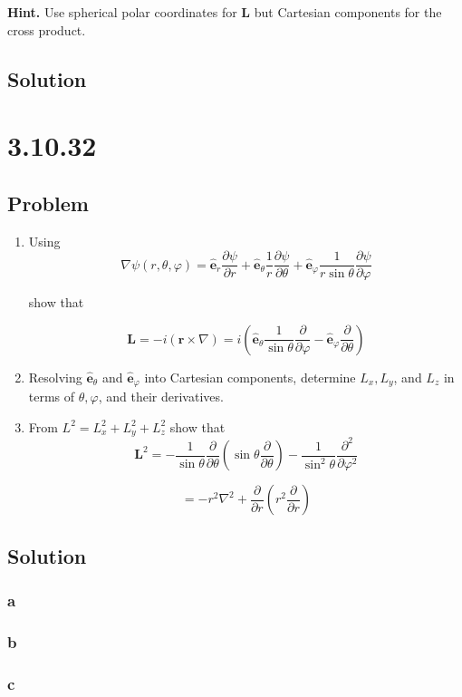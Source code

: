 \documentclass[12pt]{article}
\begin{document}
\textbf{Hint.} Use spherical polar coordinates for \textbf{L}
but Cartesian components for the cross product.

\subsection{Solution}

\section{3.10.32}

\subsection{Problem}

\begin{enumerate}[label= \textbf{(\alph*)}]
    \item Using
          \[
              \nabla \psi (r, \theta, \varphi) = \hat{\textbf{e}}_r \frac{\partial \psi}{\partial r}
              + \hat{\textbf{e}}_\theta \frac{1}{r} \frac{\partial \psi}{\partial \theta}
              + \hat{\textbf{e}}_\varphi \frac{1}{r \sin{\theta}} \frac{\partial \psi}{\partial \varphi}
          \]

          show that

          \[
              \textbf{L} = -i \left(\textbf{r} \times \nabla\right)
              = i
              \left(
              \hat{\textbf{e}}_\theta \frac{1}{\sin{\theta}} \frac{\partial}{\partial \varphi}
              - \hat{\textbf{e}}_\varphi \frac{\partial}{\partial \theta}
              \right)
          \]

    \item Resolving \(\hat{\textbf{e}}_\theta \) and \(\hat{\textbf{e}}_\varphi \)
          into Cartesian components, determine \(L_x, L_y\), and \(L_z\) in terms of
          \(\theta , \varphi \), and their derivatives.

    \item From \(L^2 = L_x^2 + L_y^2 + L_z^2\) show that
          \[
              \textbf{L}^2 = -\frac{1}{\sin{\theta}} \frac{\partial}{\partial \theta}
              \left(\sin{\theta} \frac{\partial}{\partial \theta}\right)
              - \frac{1}{\sin^2{\theta}} \frac{\partial^2}{\partial \varphi^2}
          \]

          \[
              = -r^2 \nabla^2 + \frac{\partial}{\partial r} \left(r^2 \frac{\partial}{\partial r}\right)
          \]
\end{enumerate}

\subsection{Solution}

\subsubsection{a}

\subsubsection{b}

\subsubsection{c}



\nocite{arfken2013mathematical}
\end{document}
